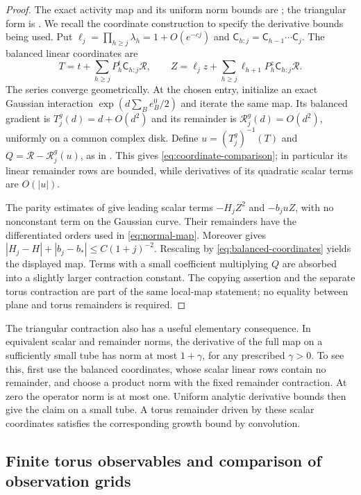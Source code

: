 \begin{proof}
The exact activity map and its uniform norm bounds are
\cite[Proposition~4.1]{F}; the triangular form is
\cite[Equation~(93)]{F}.  We recall the coordinate construction to
specify the derivative bounds being used.  Put
$\ell_j=\prod_{h\ge j}\lambda_h=1+O(e^{-cj})$ and
$\mathsf C_{h:j}=\mathsf C_{h-1}\cdots\mathsf C_j$.  The balanced
linear coordinates are
\[
 T=t+\sum_{h\ge j}P_h^t\mathsf C_{h:j}\mathcal R,
 \qquad
 Z=\ell_jz+\sum_{h\ge j}\ell_{h+1}P_h^z\mathsf C_{h:j}\mathcal R.
\]
The series converge geometrically.  At the chosen entry, initialize an
exact Gaussian interaction $\exp(d\sum_Be_B^0/2)$ and iterate the
same map.  Its balanced gradient is $T_j^g(d)=d+O(d^2)$ and its
remainder is $\mathcal R_j^g(d)=O(d^2)$, uniformly on a common complex
disk.  Define $u=(T_j^g)^{-1}(T)$ and
$Q=\mathcal R-\mathcal R_j^g(u)$, as in
\cite[Equations~(95), (99), and (101)]{F}.  This gives
\eqref{eq:coordinate-comparison}; in particular its linear remainder
rows are bounded, while derivatives of its quadratic scalar terms are
$O(|u|)$.

The parity estimates of \cite[Lemma~5.2]{F} give leading scalar terms
$-H_jZ^2$ and $-b_juZ$, with no nonconstant term on the Gaussian curve.
Their remainders have the differentiated orders used in
\eqref{eq:normal-map}.  Moreover
\cite[Lemma~5.3]{F} gives
$|H_j-H|+|b_j-b_*|\le C(1+j)^{-2}$.
Rescaling by \eqref{eq:balanced-coordinates} yields the displayed
map.  Terms with a small coefficient multiplying $Q$ are absorbed into
a slightly larger contraction constant.  The copying assertion and the
separate torus contraction are part of the same local-map statement;
no equality between plane and torus remainders is required.
\end{proof}

The triangular contraction also has a useful elementary consequence.
In equivalent scalar and remainder norms, the derivative of the full
map on a sufficiently small tube has norm at most $1+\gamma$, for any
prescribed $\gamma>0$.  To see this, first use the balanced coordinates,
whose scalar linear rows contain no remainder, and choose a product
norm with the fixed remainder contraction.  At zero the operator norm
is at most one.  Uniform analytic derivative bounds then give the
claim on a small tube.  A torus remainder driven by these scalar
coordinates satisfies the corresponding growth bound by convolution.

\subsection{Finite torus observables and comparison of observation grids}

